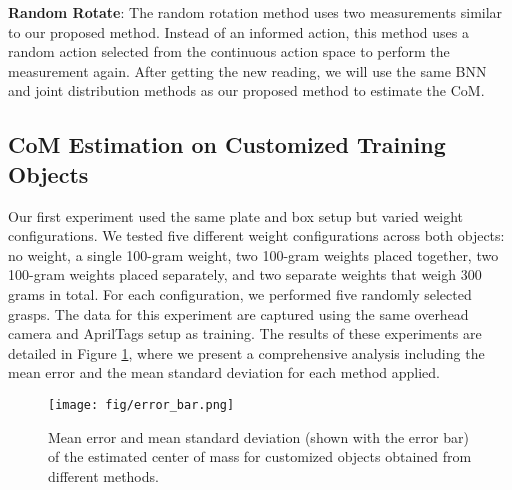 \textbf{Random Rotate}: The random rotation method uses two measurements similar to our proposed method. Instead of an informed action, this method uses a random action selected from the continuous action space to perform the measurement again. After getting the new reading, we will use the same BNN and joint distribution methods as our proposed method to estimate the CoM. %



\subsection{CoM Estimation on Customized Training Objects}


Our first experiment used the same plate and box setup but varied weight configurations. We tested five different weight configurations across both objects: no weight, a single 100-gram weight, two 100-gram weights placed together, two 100-gram weights placed separately, and two separate weights that weigh 300 grams in total. For each configuration, we performed five randomly selected grasps.  The data for this experiment are captured using the same overhead camera and AprilTags setup as training. The results of these experiments are detailed in Figure \ref{result1}, where we present a comprehensive analysis including the mean error and the mean standard deviation for each method applied.

\begin{figure}[hbtp]
\vspace{2mm}
\begin{center}
\texttt{[image: fig/error\_bar.png]}
\end{center}
\caption{Mean error and mean standard deviation (shown with the error bar) of the estimated center of mass for customized objects obtained from different methods.}
\label{result1}
\vspace{-5mm}
\end{figure}

